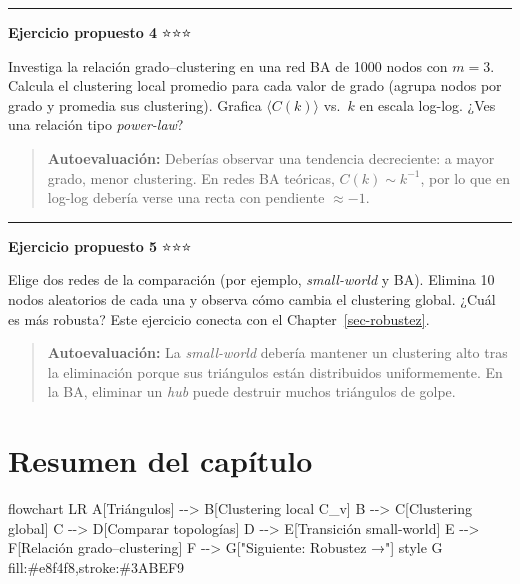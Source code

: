 \documentclass[
  letterpaper,
  DIV=11,
  numbers=noendperiod]{scrreprt}
\newenvironment{Shaded}{\begin{snugshade}}{\end{snugshade}}
\newcommand{\NormalTok}[1]{\textcolor[rgb]{0.00,0.23,0.31}{#1}}
\begin{document}
\begin{center}\rule{0.5\linewidth}{0.5pt}\end{center}

\textbf{Ejercicio propuesto 4} ⭐⭐⭐

Investiga la relación grado--clustering en una red BA de 1000 nodos con
\(m = 3\). Calcula el clustering local promedio para cada valor de grado
(agrupa nodos por grado y promedia sus clustering). Grafica
\(\langle C(k) \rangle\) vs.~\(k\) en escala log-log. ¿Ves una relación
tipo \emph{power-law}?

\begin{quote}
\textbf{Autoevaluación:} Deberías observar una tendencia decreciente: a
mayor grado, menor clustering. En redes BA teóricas,
\(C(k) \sim k^{-1}\), por lo que en log-log debería verse una recta con
pendiente \(\approx -1\).
\end{quote}

\begin{center}\rule{0.5\linewidth}{0.5pt}\end{center}

\textbf{Ejercicio propuesto 5} ⭐⭐⭐

Elige dos redes de la comparación (por ejemplo, \emph{small-world} y
BA). Elimina 10 nodos aleatorios de cada una y observa cómo cambia el
clustering global. ¿Cuál es más robusta? Este ejercicio conecta con el
Chapter~\ref{sec-robustez}.

\begin{quote}
\textbf{Autoevaluación:} La \emph{small-world} debería mantener un
clustering alto tras la eliminación porque sus triángulos están
distribuidos uniformemente. En la BA, eliminar un \emph{hub} puede
destruir muchos triángulos de golpe.
\end{quote}

\section{Resumen del capítulo}\label{resumen-del-capuxedtulo-3}

\begin{Shaded}
\begin{Highlighting}[]
\NormalTok{flowchart LR}
\NormalTok{    A[Triángulos] {-}{-}\textgreater{} B[Clustering local C\_v]}
\NormalTok{    B {-}{-}\textgreater{} C[Clustering global]}
\NormalTok{    C {-}{-}\textgreater{} D[Comparar topologías]}
\NormalTok{    D {-}{-}\textgreater{} E[Transición small{-}world]}
\NormalTok{    E {-}{-}\textgreater{} F[Relación grado–clustering]}
\NormalTok{    F {-}{-}\textgreater{} G["Siguiente: Robustez →"]}
\NormalTok{    style G fill:\#e8f4f8,stroke:\#3ABEF9}
\end{Highlighting}
\end{Shaded}
\end{document}
